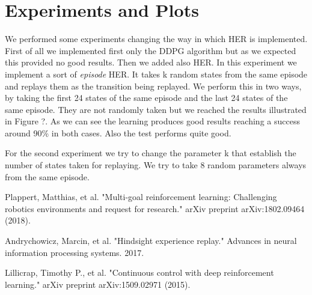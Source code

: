 \documentclass[a4paper]{report}
\begin{document}
\section{Experiments and Plots}
We performed some experiments changing the way in which HER is implemented.
First of all we implemented first only the DDPG algorithm but as we expected this provided no good results. Then we added also HER. In this experiment we implement a sort of \textit{episode} HER. It takes k random states from the same episode and replays them as the transition being replayed. We perform this in two ways, by taking the first 24 states of the same episode and the last 24 states of the same episode. They are not randomly taken but we reached the results illustrated in Figure ?. As we can see the learning produces good results reaching a success around 90\% in both cases. Also the test performs quite good.

For the second experiment we try to change the parameter k that establish the number of states taken for replaying. We try to take 8 random parameters always from the same episode. 



\begin{thebibliography}{}

Plappert, Matthias, et al. "Multi-goal reinforcement learning: Challenging robotics environments and request for research." arXiv preprint arXiv:1802.09464 (2018).

Andrychowicz, Marcin, et al. "Hindsight experience replay." Advances in neural information processing systems. 2017.

Lillicrap, Timothy P., et al. "Continuous control with deep reinforcement learning." arXiv preprint arXiv:1509.02971 (2015).

\end{thebibliography}
\end{document}
